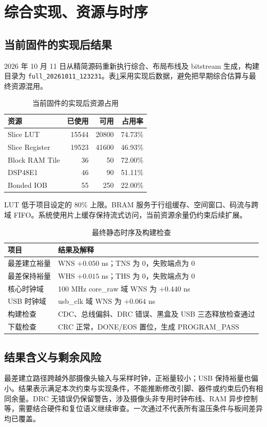 \section{综合实现、资源与时序}
\subsection{当前固件的实现后结果}
2026 年 10 月 11 日从精简源码重新执行综合、布局布线及 bitstream 生成，构建目录为 \texttt{full\_20261011\_123231}。表\ref{tab:resource}采用实现后数据，避免把早期综合估算与最终资源混用。

\begin{table}[H]\centering\caption{当前固件的实现后资源占用}\label{tab:resource}
\begin{tabular}{@{}lrrr@{}}\toprule
资源 & 已使用 & 可用 & 占用率\\\midrule
Slice LUT & 15544 & 20800 & 74.73\%\\
Slice Register & 19523 & 41600 & 46.93\%\\
Block RAM Tile & 36 & 50 & 72.00\%\\
DSP48E1 & 46 & 90 & 51.11\%\\
Bonded IOB & 55 & 250 & 22.00\%\\\bottomrule
\end{tabular}\end{table}
LUT 低于项目设定的 80\% 上限。BRAM 服务于行组缓存、空间窗口、码流与跨域 FIFO。系统使用片上缓存保持流式访问，当前资源余量仍约束后续扩展。

\begin{table}[H]\centering\caption{最终静态时序及构建检查}
\begin{tabularx}{\linewidth}{@{}lY@{}}\toprule
项目 & 结果及解释\\\midrule
最差建立裕量 & WNS $+0.050$ ns；TNS 为 0，失败端点为 0\\
最差保持裕量 & WHS $+0.015$ ns；THS 为 0，失败端点为 0\\
核心时钟域 & 100 MHz core\_raw 域 WNS 为 $+0.440$ ns\\
USB 时钟域 & usb\_clk 域 WNS 为 $+0.064$ ns\\
构建检查 & CDC、总线偏斜、DRC 错误、黑盒及 USB 三态释放检查通过\\
下载检查 & CRC 正常，DONE/EOS 置位，生成 PROGRAM\_PASS\\\bottomrule
\end{tabularx}\end{table}

\subsection{结果含义与剩余风险}
最差建立路径跨越外部摄像头输入与采样时钟，正裕量较小；USB 保持裕量也偏小。结果表示满足本次约束与实现条件，不能推断修改引脚、器件或约束后仍有相同余量。DRC 无错误仍保留警告，涉及摄像头非专用时钟布线、RAM 异步控制等，需要结合硬件和复位语义继续审查。一次通过不代表所有温压条件与板间差异均已覆盖。

